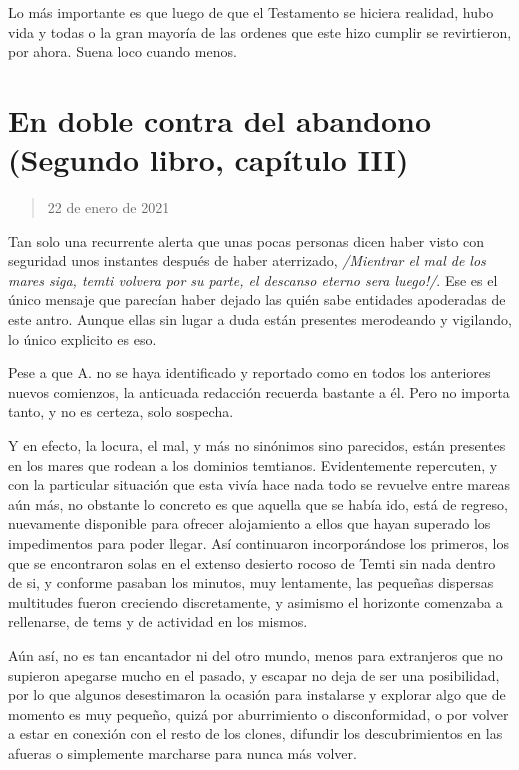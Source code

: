 \documentclass[
]{book}
\begin{document}
Lo más importante es que luego de que el Testamento se hiciera realidad, hubo vida y todas o la gran mayoría de las ordenes que este hizo cumplir se revirtieron, por ahora. Suena loco cuando menos.

\hypertarget{en-doble-contra-del-abandono-segundo-libro-capuxedtulo-iii}{%
\section{En doble contra del abandono (Segundo libro, capítulo III)}\label{en-doble-contra-del-abandono-segundo-libro-capuxedtulo-iii}}

\begin{quote}
22 de enero de 2021
\end{quote}

Tan solo una recurrente alerta que unas pocas personas dicen haber visto con seguridad unos instantes después de haber aterrizado, \emph{/Mientrar el mal de los mares siga, temti volvera por su parte, el descanso eterno sera luego!/}. Ese es el único mensaje que parecían haber dejado las quién sabe entidades apoderadas de este antro. Aunque ellas sin lugar a duda están presentes merodeando y vigilando, lo único explicito es eso.

Pese a que A. no se haya identificado y reportado como en todos los anteriores nuevos comienzos, la anticuada redacción recuerda bastante a él. Pero no importa tanto, y no es certeza, solo sospecha.

Y en efecto, la locura, el mal, y más no sinónimos sino parecidos, están presentes en los mares que rodean a los dominios temtianos. Evidentemente repercuten, y con la particular situación que esta vivía hace nada todo se revuelve entre mareas aún más, no obstante lo concreto es que aquella que se había ido, está de regreso, nuevamente disponible para ofrecer alojamiento a ellos que hayan superado los impedimentos para poder llegar. Así continuaron incorporándose los primeros, los que se encontraron solas en el extenso desierto rocoso de Temti sin nada dentro de si, y conforme pasaban los minutos, muy lentamente, las pequeñas dispersas multitudes fueron creciendo discretamente, y asimismo el horizonte comenzaba a rellenarse, de tems y de actividad en los mismos.

Aún así, no es tan encantador ni del otro mundo, menos para extranjeros que no supieron apegarse mucho en el pasado, y escapar no deja de ser una posibilidad, por lo que algunos desestimaron la ocasión para instalarse y explorar algo que de momento es muy pequeño, quizá por aburrimiento o disconformidad, o por volver a estar en conexión con el resto de los clones, difundir los descubrimientos en las afueras o simplemente marcharse para nunca más volver.
\end{document}
